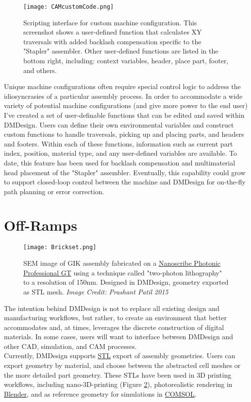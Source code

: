 {\begin{figure}
  \texttt{[image: CAMcustomCode.png]}
  \caption{Scripting interface for custom machine configuration.  This screenshot shows a user-defined function that calculates XY traversals with added backlash compensation specific to the "Stapler" assembler.  Other user-defined functions are listed in the bottom right, including: context variables, header, place part, footer, and others.}
  \label{fig:CAMcustomCode}
\end{figure}

Unique machine configurations often require special control logic to address the idiosyncrasies of a particular assembly process.  In order to accommodate a wide variety of potential machine configurations (and give more power to the end user) I've created a set of user-definable functions that can be edited and saved within DMDesign.  Users can define their own environmental variables and construct custom functions to handle traversals, picking up and placing parts, and headers and footers.  Within each of these functions, information such as current part index, position, material type, and any user-defined variables are available.  To date, this feature has been used for backlash compensation and multimaterial head placement of the "Stapler" assembler.  Eventually, this capability could grow to support closed-loop control between the machine and DMDesign for on-the-fly path planning or error correction.\\

\section{Off-Ramps}

\begin{figure}
  \texttt{[image: Brickset.png]}
  \caption{SEM image of GIK assembly fabricated on a \href{http://www.nanoscribe.de/en/products/photonic-professional-gt/}{Nanoscribe Photonic Professional GT} using a technique called "two-photon lithography" to a resolution of 150nm.  Designed in DMDesign, geometry exported as STL mesh.  \textit{Image Credit: Prashant Patil 2015}}
  \label{fig:BrickSet}
\end{figure}

The intention behind DMDesign is not to replace all existing design and manufacturing workflows, but rather, to create an environment that better accommodates and, at times, leverages the discrete construction of digital materials.  In some cases, users will want to interface between DMDesign and other CAD, simulation, and CAM processes.\\

Currently, DMDesign supports \href{https://en.wikipedia.org/wiki/STL_(file_format)}{STL} export of assembly geometries.  Users can export geometry by material, and choose between the abstracted cell meshes or the more detailed part geometry.  These STLs have been used in 3D printing workflows, including nano-3D-printing (Figure \ref{fig:BrickSet}), photorealistic rendering in \href{https://www.blender.org/}{Blender}, and as reference geometry for simulations in \href{https://www.comsol.com/}{COMSOL}.

}
